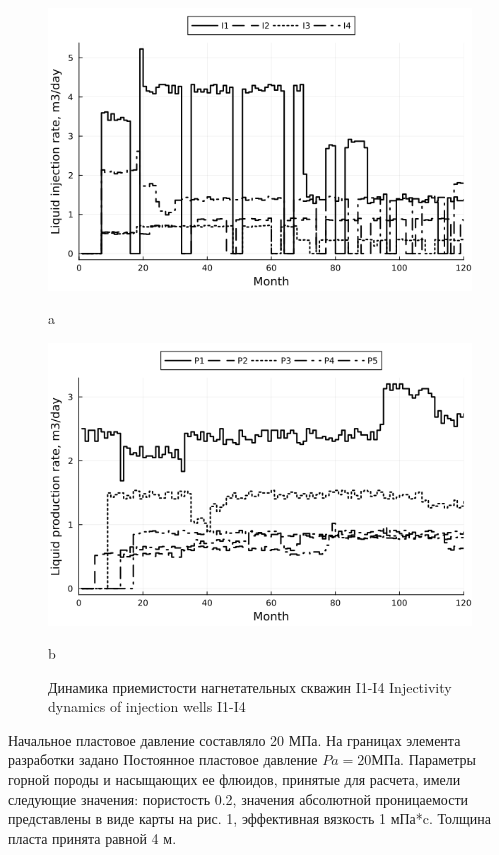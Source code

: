 \documentclass{article}
\begin{document}
\begin{figure}
	\centering
	\begin{minipage}{0.5\linewidth}
		\includegraphics[width=1\textwidth]{fig2}
		\caption{a}
		\label{inj_rate}
	\end{minipage}%
	\begin{minipage}{0.5\linewidth}
		\centering
		\includegraphics[width=1\textwidth]{fig3}
		\caption{b}
		\label{prod_rate}
	\end{minipage}
	\caption{Динамика приемистости нагнетательных скважин I1-I4 Injectivity dynamics of injection wells I1-I4}
\end{figure}

 Начальное пластовое давление составляло 20 МПа. На границах элемента разработки задано Постоянное пластовое давление $Pa = 20 МПа$. Параметры горной породы и насыщающих ее флюидов, принятые для расчета, имели следующие значения: пористость 0.2, значения абсолютной проницаемости представлены в виде карты на рис. 1, эффективная вязкость 1 мПа*c. Толщина пласта принята равной 4 м.
\end{document}
